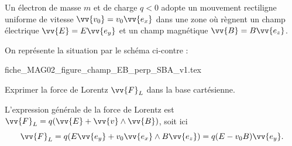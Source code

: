                                 \initialisationPartieGauche %
Un électron de masse $m$ et de charge $q<0$  adopte un mouvement rectiligne uniforme de vitesse $\vv{v_0}=v_0 \vv{e_x}$ dans une zone où règnent un champ électrique $\vv{E}=E\vv{e_y}$ et un champ magnétique $\vv{B}=B\vv{e_z}$. 

\smallskip

On représente la situation par le schéma ci-contre :
                                \initialisationPartieDroite %
\begin{center}
{fiche_MAG02_figure_champ_EB_perp_SBA_v1.tex}
\end{center}
                               \finalisationDuPartageDePage %



\begin{enonce}
Exprimer la force de Lorentz $\vv{F}_L$ dans la base cartésienne.
\end{enonce}


\begin{corrige}
L'expression générale de la force de Lorentz est $\vv{F}_L=q(\vv{E}+\vv{v}\wedge \vv{B})$, soit ici 
\[
\vv{F}_L=q(E\vv{e_y}+v_0 \vv{e_x} \wedge B\vv{e_z})=q(E-v_0B)\vv{e_y}.
\]
\end{corrige}



